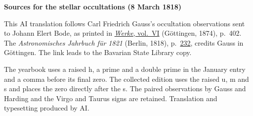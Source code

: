 \clearpage\thispagestyle{empty}
\begin{center}\textbf{Sources for the stellar occultations (8 March 1818)}\end{center}
\noindent This AI translation follows Carl Friedrich Gauss’s occultation observations sent to Johann Elert Bode, as printed in \href{https://gdz.sub.uni-goettingen.de/id/PPN236007467}{\textit{Werke}, vol.~VI} (Göttingen, 1874), p.~402. The \textit{Astronomisches Jahrbuch für 1821} (Berlin, 1818), p.~\href{https://api.digitale-sammlungen.de/iiif/image/v2/bsb10538350_00238/full/1600,/0/default.jpg}{232}, credits Gauss in Göttingen. The link leads to the Bavarian State Library copy.
\par\smallskip\noindent The yearbook uses a raised h, a prime and a double prime in the January entry and a comma before its final zero. The collected edition uses the raised u, m and s and places the zero directly after the s. The paired observations by Gauss and Harding and the Virgo and Taurus signs are retained. Translation and typesetting produced by AI.
\clearpage
